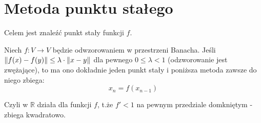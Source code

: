 \section{Metoda punktu stałego}
Celem jest znaleźć punkt stały funkcji \( f \).

\begin{theorem} 
    Niech \( f: V \rightarrow V \) będzie odwzorowaniem w przestrzeni Banacha. Jeśli \( \left\Vert f(x) - f(y) \right\Vert \leq \lambda \cdot \left\Vert x - y \right\Vert \) dla pewnego \( 0 \leq \lambda < 1 \) (odzworowanie jest zwężające), to ma ono dokładnie jeden punkt stały i poniższa metoda zawsze do niego zbiega: \\
    \[
        x_n = f(x_{n-1})
    \]
\end{theorem}

Czyli w \( \mathbb{R} \) działa dla funkcji \( f \), t.że \( f' < 1 \) na pewnym przedziale domkniętym - zbiega kwadratowo. \\